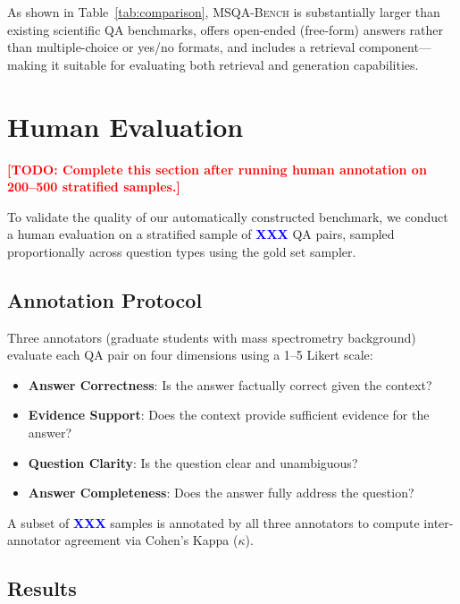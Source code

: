 \documentclass[11pt]{article}
\newcommand{\msqa}{\textsc{MSQA-Bench}}
\newcommand{\todo}[1]{\textcolor{red}{\textbf{[TODO: #1]}}}
\newcommand{\placeholder}[1]{\textcolor{blue}{\textbf{#1}}}
\begin{document}
As shown in Table~\ref{tab:comparison}, \msqa{} is substantially larger than existing scientific QA benchmarks, offers open-ended (free-form) answers rather than multiple-choice or yes/no formats, and includes a retrieval component---making it suitable for evaluating both retrieval and generation capabilities.

\section{Human Evaluation}
\label{sec:human_eval}

\todo{Complete this section after running human annotation on 200--500 stratified samples.}

To validate the quality of our automatically constructed benchmark, we conduct a human evaluation on a stratified sample of \placeholder{XXX} QA pairs, sampled proportionally across question types using the gold set sampler.

\subsection{Annotation Protocol}

Three annotators (graduate students with mass spectrometry background) evaluate each QA pair on four dimensions using a 1--5 Likert scale:
\begin{itemize}[leftmargin=*,itemsep=1pt]
    \item \textbf{Answer Correctness}: Is the answer factually correct given the context?
    \item \textbf{Evidence Support}: Does the context provide sufficient evidence for the answer?
    \item \textbf{Question Clarity}: Is the question clear and unambiguous?
    \item \textbf{Answer Completeness}: Does the answer fully address the question?
\end{itemize}

A subset of \placeholder{XXX} samples is annotated by all three annotators to compute inter-annotator agreement via Cohen's Kappa ($\kappa$).

\subsection{Results}
\end{document}
